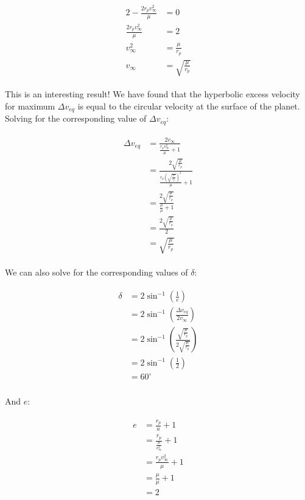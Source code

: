 \documentclass[
]{article}
\begin{document}
\[\begin{aligned}
\begin{aligned}
    2 - \frac{2r_p v_\infty^2}{\mu} &= 0 \\
    \frac{2r_p v_\infty^2}{\mu} &= 2 \\
    v_\infty^2 &= \frac{\mu}{r_p} \\
    v_\infty &= \sqrt{\frac{\mu}{r_p}}
\end{aligned}
\end{aligned}\]

This is an interesting result! We have found that the hyperbolic excess
velocity for maximum \(\Delta v_{eq}\) is equal to the circular velocity
at the surface of the planet. Solving for the corresponding value of
\(\Delta v_{eq}\):

\[\begin{aligned}
\begin{aligned}
    \Delta v_{eq} &= \frac{2 v_\infty}{\frac{r_p v_\infty^2}{\mu} + 1} \\
    &= \frac{2 \sqrt{\frac{\mu}{r_p}}}{\frac{r_p \left( \sqrt{\frac{\mu}{r_p}} \right)^2}{\mu} + 1} \\
    &= \frac{2 \sqrt{\frac{\mu}{r_p}}}{\frac{\mu}{\mu} + 1} \\
    &= \frac{2 \sqrt{\frac{\mu}{r_p}}}{2} \\
    &= \sqrt{\frac{\mu}{r_p}}
\end{aligned}
\end{aligned}\]

We can also solve for the corresponding values of \(\delta\):

\[\begin{aligned}
\begin{aligned}
    \delta &= 2 \sin^{-1} \left( \frac{1}{e} \right) \\
    &= 2 \sin^{-1} \left( \frac{\Delta v_{eq}}{2 v_\infty} \right) \\
    &= 2 \sin^{-1} \left( \frac{\sqrt{\frac{\mu}{r_p}}}{2 \sqrt{\frac{\mu}{r_p}}} \right) \\
    &= 2 \sin^{-1} \left( \frac{1}{2} \right) \\
    &= 60^\circ \\
\end{aligned}
\end{aligned}\]

And \(e\):

\[\begin{aligned}
\begin{aligned}
    e &= \frac{r_p}{a} + 1 \\
    &= \frac{r_p}{\frac{\mu}{v_\infty^2}} + 1 \\
    &= \frac{r_p v_\infty^2}{\mu} + 1 \\
    &= \frac{\mu}{\mu} + 1 \\
    &= 2
\end{aligned}
\end{aligned}\]
\end{document}

